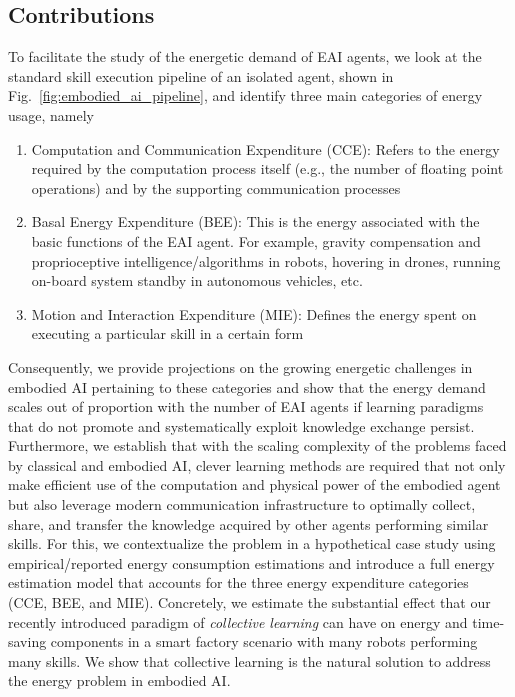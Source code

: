 \subsection{Contributions}
To facilitate the study of the energetic demand of EAI agents, we look at the standard skill execution pipeline of an isolated agent, shown in Fig.~\ref{fig:embodied_ai_pipeline}, and identify three main categories of energy usage, namely
\begin{enumerate}
	\item Computation and Communication Expenditure (CCE): Refers to the energy required by the computation process itself (e.g., the number of floating point operations) and by the supporting communication processes
	\item Basal Energy Expenditure (BEE): This is the energy associated with the basic functions of the EAI agent. For example, gravity compensation and proprioceptive intelligence/algorithms in robots, hovering in drones, running on-board system standby in autonomous vehicles, etc.
	\item Motion and Interaction Expenditure (MIE): Defines the energy spent on executing a particular skill in a certain form
\end{enumerate}
Consequently, we provide projections on the growing energetic challenges in embodied AI pertaining to these categories and show that the energy demand scales out of proportion with the number of EAI agents if learning paradigms that do not promote and systematically exploit knowledge exchange persist. Furthermore, we establish that with the scaling complexity of the problems faced by classical and embodied AI, clever learning methods are required that not only make efficient use of the computation and physical power of the embodied agent but also leverage modern communication infrastructure to optimally collect, share, and transfer the knowledge acquired by other agents performing similar skills. For this, we contextualize the problem in a hypothetical case study using empirical/reported energy consumption estimations and introduce a full energy estimation model that accounts for the three energy expenditure categories (CCE, BEE, and MIE). Concretely, we estimate the substantial effect that our recently introduced paradigm of \emph{collective learning} can have on energy and time-saving components in a smart factory scenario with many robots performing many skills. We show that collective learning is the natural solution to address the energy problem in embodied AI.

